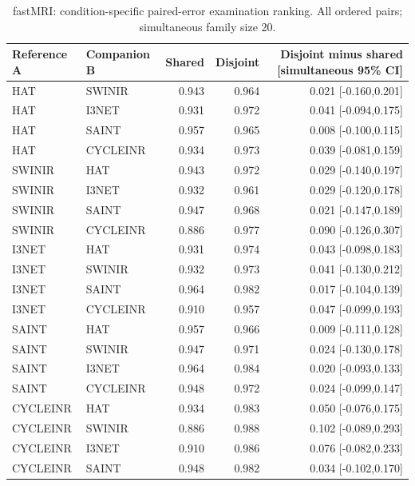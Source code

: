 \begin{table}[t]\centering\small
\caption{fastMRI: condition-specific paired-error examination ranking. All ordered pairs; simultaneous family size 20.}
\begin{tabular}{llrrr}\toprule Reference A & Companion B & Shared & Disjoint & Disjoint minus shared [simultaneous 95\% CI]\\\midrule
HAT & SWINIR & 0.943 & 0.964 & 0.021 [-0.160,0.201] \\
HAT & I3NET & 0.931 & 0.972 & 0.041 [-0.094,0.175] \\
HAT & SAINT & 0.957 & 0.965 & 0.008 [-0.100,0.115] \\
HAT & CYCLEINR & 0.934 & 0.973 & 0.039 [-0.081,0.159] \\
SWINIR & HAT & 0.943 & 0.972 & 0.029 [-0.140,0.197] \\
SWINIR & I3NET & 0.932 & 0.961 & 0.029 [-0.120,0.178] \\
SWINIR & SAINT & 0.947 & 0.968 & 0.021 [-0.147,0.189] \\
SWINIR & CYCLEINR & 0.886 & 0.977 & 0.090 [-0.126,0.307] \\
I3NET & HAT & 0.931 & 0.974 & 0.043 [-0.098,0.183] \\
I3NET & SWINIR & 0.932 & 0.973 & 0.041 [-0.130,0.212] \\
I3NET & SAINT & 0.964 & 0.982 & 0.017 [-0.104,0.139] \\
I3NET & CYCLEINR & 0.910 & 0.957 & 0.047 [-0.099,0.193] \\
SAINT & HAT & 0.957 & 0.966 & 0.009 [-0.111,0.128] \\
SAINT & SWINIR & 0.947 & 0.971 & 0.024 [-0.130,0.178] \\
SAINT & I3NET & 0.964 & 0.984 & 0.020 [-0.093,0.133] \\
SAINT & CYCLEINR & 0.948 & 0.972 & 0.024 [-0.099,0.147] \\
CYCLEINR & HAT & 0.934 & 0.983 & 0.050 [-0.076,0.175] \\
CYCLEINR & SWINIR & 0.886 & 0.988 & 0.102 [-0.089,0.293] \\
CYCLEINR & I3NET & 0.910 & 0.986 & 0.076 [-0.082,0.233] \\
CYCLEINR & SAINT & 0.948 & 0.982 & 0.034 [-0.102,0.170] \\
\bottomrule\end{tabular}\end{table}
